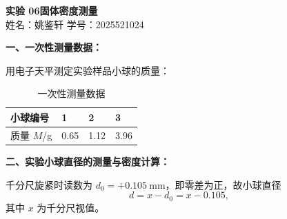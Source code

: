 \documentclass[12pt,a4paper,fontset=windows]{ctexart}
\begin{document}
\begin{center}
    {\bfseries 实验 06\quad 固体密度测量}\\[8pt]
    { 姓名：姚鉴轩 \quad 学号：2025521024}
\end{center}

\vspace{0.3cm}

\noindent\textbf{一、一次性测量数据：}

\vspace{0.1cm}
用电子天平测定实验样品小球的质量：

\begin{table}[H]
    \centering
    \caption{一次性测量数据}
    \renewcommand{\arraystretch}{1.4}
    \begin{tabular}{|C{4.0cm}|C{3.2cm}|C{3.2cm}|C{3.2cm}|}
        \hline
        小球编号 & 1 & 2 & 3 \\
        \hline
        质量 $M$/g & 0.65 & 1.12 & 3.96 \\
        \hline
    \end{tabular}
\end{table}

\vspace{0.2cm}

\noindent\textbf{二、实验小球直径的测量与密度计算：}

\vspace{0.1cm}
千分尺旋紧时读数为 $d_0=+0.105\ \mathrm{mm}$，即零差为正，故小球直径
\begin{equation*}
    d=x-d_0=x-0.105,
\end{equation*}
其中 $x$ 为千分尺视值。
\end{document}
